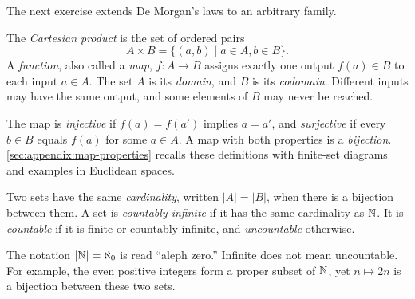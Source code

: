 
The next exercise extends De Morgan's laws to an arbitrary family.


The \emph{Cartesian product} is the set of ordered pairs
\[
  A\times B=\{(a,b)\mid a\in A, b\in B\}.
\]
A \emph{function}, also called a \emph{map}, $f:A\to B$ assigns exactly
one output $f(a)\in B$ to each input $a\in A$. The set $A$ is its
\emph{domain}, and $B$ is its \emph{codomain}. Different inputs may have
the same output, and some elements of $B$ may never be reached.

The map is \emph{injective} if $f(a)=f(a')$ implies $a=a'$, and
\emph{surjective} if every $b\in B$ equals $f(a)$ for some $a\in A$.
A map with both properties is a \emph{bijection}.
\autoref{sec:appendix:map-properties} recalls these definitions with
finite-set diagrams and examples in Euclidean spaces.

\begin{definition}
  Two sets have the same \emph{cardinality}, written $|A|=|B|$, when there
  is a bijection between them. A set is \emph{countably infinite} if it
  has the same cardinality as $\mathbb{N}$. It is \emph{countable} if it is finite
  or countably infinite, and \emph{uncountable} otherwise.
\end{definition}
The notation $|\mathbb{N}|=\aleph_0$ is read ``aleph zero.'' Infinite does not
mean uncountable. For example, the even positive integers form a proper
subset of $\mathbb{N}$, yet $n\mapsto 2n$ is a bijection between these two sets.



